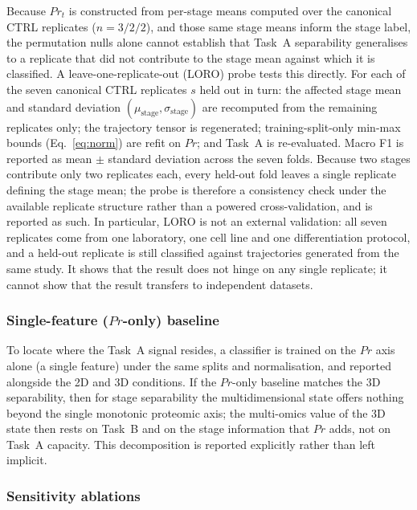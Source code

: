 \documentclass[5p,times,twocolumn]{elsarticle}
\newcommand{\rtag}[1]{}
\newcommand{\rev}[2]{\rtag{#1}#2}
\begin{document}
Because $Pr_{t}$ is constructed from per-stage means computed
over the canonical CTRL replicates ($n = 3/2/2$), and those
same stage means inform the stage label, the permutation
nulls alone cannot establish that Task~A separability
generalises to a replicate that did not contribute to the
stage mean against which it is classified. A
leave-one-replicate-out (LORO) probe tests this directly.
For each of the seven canonical CTRL replicates $s$ held out
in turn: the affected stage mean and standard deviation
$(\mu_{\text{stage}}, \sigma_{\text{stage}})$ are recomputed
from the remaining replicates only; the trajectory tensor is
regenerated; training-split-only min-max bounds
(Eq.~\eqref{eq:norm}) are refit on $Pr$; and Task~A is
re-evaluated. Macro F1 is reported as mean $\pm$ standard
deviation across the seven folds.
Because two stages contribute only two replicates each, every
held-out fold leaves a single replicate defining the stage
mean; the probe is therefore a consistency check under the
available replicate structure rather than a powered
cross-validation, and is reported as such.
\rev{R1.3}{In particular, LORO is not an external validation:
  all seven replicates come from one laboratory, one cell line
  and one differentiation protocol, and a held-out replicate is
  still classified against trajectories generated from the same
  study. It shows that the result does not hinge on any single
  replicate; it cannot show that the result transfers to
  independent datasets.}

\subsubsection{Single-feature ($Pr$-only) baseline}
\label{sec:pronly}

To locate where the Task~A signal resides, a classifier is
trained on the $Pr$ axis alone (a single feature) under the
same splits and normalisation, and reported alongside the 2D
and 3D conditions. If the $Pr$-only baseline matches the 3D
separability, then for stage separability the
multidimensional state offers nothing beyond the single
monotonic proteomic axis; the multi-omics value of the 3D
state then rests on \rev{AC}{Task~B and on the stage information
  that $Pr$ adds}, not on Task~A capacity. This decomposition is
reported explicitly rather than left implicit.

\subsubsection{Sensitivity ablations}
\label{sec:ablations}
\end{document}
